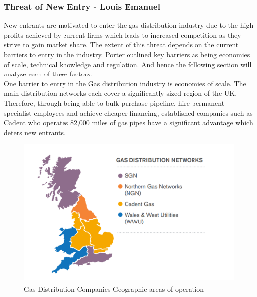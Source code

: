 \documentclass[11pt]{article}		%
\newlength{\imageheight}	 %
\newcommand{\supercite}[1]{\textsuperscript{\cite{#1}}}		%
\begin{document}
		\subsubsection[Threat of New Entry]{Threat of New Entry - Louis Emanuel}
				New entrants are motivated to enter the gas distribution industry due to the high profits achieved by current firms which leads to increased competition as they strive to gain market share. The extent of this threat depends on the current barriers to entry in the industry. Porter outlined key barriers as being economies of scale, technical knowledge and regulation. And hence the following section will analyse each of these factors. \\
				
				One barrier to entry in the Gas distribution industry is economies of scale. The main distribution networks each cover a significantly sized region of the UK. Therefore, through being able to bulk purchase pipeline, hire permanent specialist employees and achieve cheaper financing, established companies such as Cadent who operates 82,000 miles of gas pipes have a significant advantage which deters new entrants. \\
				\begin{figure}[h]
				    \centering
			    	\includegraphics[height = \imageheight]{distribution}
				    \caption{Gas Distribution Companies Geographic areas of operation\supercite{sönnichsen_5_2021}}
		    	\label{distrit}
	        	\end{figure}
				
\end{document}
